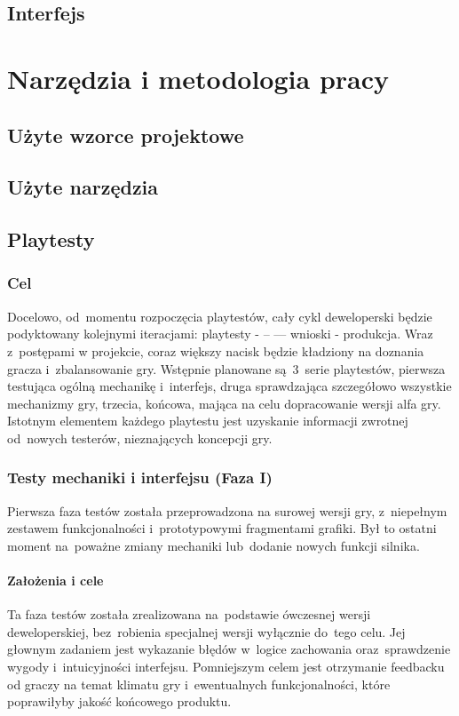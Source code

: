 \documentclass[licencjacka]{pracamgr}
\begin{document}
  \section{Interfejs}

\chapter{Narzędzia i metodologia pracy}

  \section{Użyte wzorce projektowe}

  \section{Użyte narzędzia}

  \section{Playtesty}
  \subsection{Cel}
  Docelowo, od~momentu rozpoczęcia playtestów, cały cykl deweloperski będzie podyktowany 
  kolejnymi iteracjami: playtesty - -- --- wnioski - produkcja. Wraz z~postępami w projekcie, 
  coraz większy nacisk będzie kładziony na doznania gracza i~zbalansowanie gry. 
  Wstępnie planowane są~3~serie playtestów, pierwsza testująca ogólną mechanikę i~interfejs,
  druga sprawdzająca szczegółowo wszystkie mechanizmy gry, trzecia, końcowa, mająca na celu dopracowanie wersji alfa gry.
  Istotnym elementem każdego playtestu jest uzyskanie informacji zwrotnej od~nowych testerów, nieznających koncepcji gry.
    
    \subsection{Testy mechaniki i interfejsu (Faza I)}
    Pierwsza faza testów została przeprowadzona na surowej wersji gry, 
    z~niepełnym zestawem funkcjonalności i~prototypowymi fragmentami grafiki. 
    Był to ostatni moment na~poważne zmiany mechaniki lub~dodanie nowych funkcji silnika.
      
      \subsubsection{Założenia i cele}
      Ta faza testów została zrealizowana na~podstawie ówczesnej wersji deweloperskiej, 
      bez~robienia specjalnej wersji wyłącznie do~tego celu. Jej głownym zadaniem jest 
      wykazanie błędów w~logice zachowania oraz~sprawdzenie wygody i~intuicyjności interfejsu. 
      Pomniejszym celem jest otrzymanie feedbacku od graczy na temat klimatu gry
      i~ewentualnych funkcjonalności, które poprawiłyby jakość końcowego produktu.
      
\end{document}

